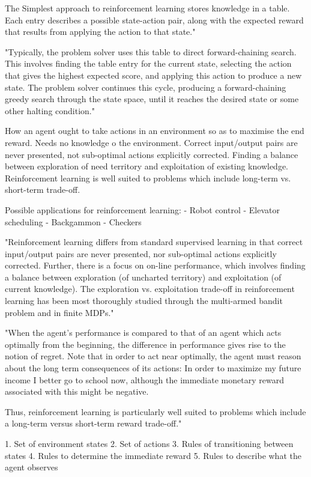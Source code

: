 \documentclass[a4paper,oneside]{report}
\begin{document}
The Simplest approach to reinforcement learning stores knowledge in a table. Each entry describes a possible state-action pair, along with the expected reward that results from applying the action to that state."

"Typically, the problem solver uses this table to direct forward-chaining search. This involves finding the table entry for the current state, selecting the action that gives the highest expected score, and applying this action to produce a new state. The problem solver continues this cycle, producing a forward-chaining greedy search through the state space, until it reaches the desired state or some other halting condition."

How an agent ought to take actions in an environment so as to maximise the end reward. Needs no knowledge o the environment. Correct input/output pairs are never presented, not sub-optimal actions explicitly corrected. Finding a balance between exploration of need territory and exploitation of existing knowledge. Reinforcement learning is well suited to problems which include long-term vs. short-term trade-off. 

Possible applications for reinforcement learning:
-	Robot control
-	Elevator scheduling
-	Backgammon
-	Checkers

"Reinforcement learning differs from standard supervised learning in that correct input/output pairs are never presented, nor sub-optimal actions explicitly corrected. Further, there is a focus on on-line performance, which involves finding a balance between exploration (of uncharted territory) and exploitation (of current knowledge). The exploration vs. exploitation trade-off in reinforcement learning has been most thoroughly studied through the multi-armed bandit problem and in finite MDPs."

"When the agent's performance is compared to that of an agent which acts optimally from the beginning, the difference in performance gives rise to the notion of regret. Note that in order to act near optimally, the agent must reason about the long term consequences of its actions: In order to maximize my future income I better go to school now, although the immediate monetary reward associated with this might be negative.

Thus, reinforcement learning is particularly well suited to problems which include a long-term versus short-term reward trade-off."

1. Set of environment states
2. Set of actions
3. Rules of transitioning between states
4. Rules to determine the immediate reward
5. Rules to describe what the agent observes
\end{document}
